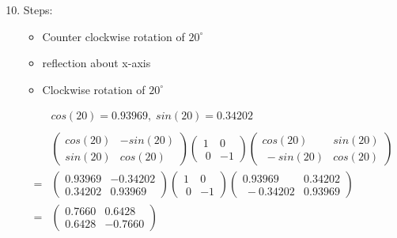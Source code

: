 \documentclass[11pt]{article}
\begin{document}
\begin{preview}
\begin{enumerate}
                  \setcounter{enumi}{9}
            \item Steps:
                  \begin{itemize}
                        \item Counter clockwise rotation of $20^{\circ}$
                        \item reflection about x-axis
                        \item Clockwise rotation of $20^{\circ}$
                  \end{itemize}
                  \begin{align*}
                          & cos(20) = 0.93969, \; sin(20) = 0.34202                                        \\\\
                          & \begin{pmatrix}cos(20)&-sin(20)\\ sin(20)&cos(20)\end{pmatrix}\begin{pmatrix}1&0\\ \:0&-1\end{pmatrix}\begin{pmatrix}cos(20)&sin(20)\\ \:-sin(20)&cos(20)\end{pmatrix} \\
                        = & \begin{pmatrix}0.93969&-0.34202\\ 0.34202&0.93969\end{pmatrix}\begin{pmatrix}1&0\\ \:0&-1\end{pmatrix}\begin{pmatrix}0.93969&0.34202\\ \:-0.34202&0.93969\end{pmatrix} \\
                        = & \begin{pmatrix}0.7660&0.6428\\ 0.6428&-0.7660\end{pmatrix}
                  \end{align*}
      \end{enumerate}
\end{preview}
\end{document}
